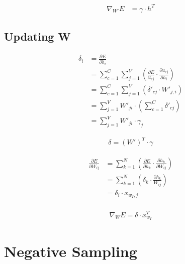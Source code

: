 \documentclass{article}
\begin{document}
	\begin{equation}
		\begin{aligned}
			\nabla_{W'} E &= \gamma \cdot h^T
		\end{aligned}	
	\end{equation}
	
	\subsection{Updating W}
	\begin{equation}
		\begin{aligned}
			\delta_i &= \frac{\partial E}{\partial h_i} \\
			&= \sum_{c=1}^{C}\sum_{j=1}^{V} \left( \frac{\partial E}{u_{cj}} \cdot \frac{\partial u_{cj}}{\partial h_i}\right)  \\
			&= \sum_{c=1}^{C}\sum_{j=1}^{V}\left( \delta'_{cj}\cdot W'_{j,i} \right)   \\
			&= \sum_{j=1}^{V} W'_{ji} \cdot \left(\sum_{c=1}^{C} \delta'_{cj} \right) \\
			&= \sum_{j=1}^{V} W'_{ji} \cdot \gamma_j
		\end{aligned}
	\end{equation}
	
	\begin{equation}
		\begin{aligned}
			\delta = (W')^T \cdot \gamma
		\end{aligned}
	\end{equation}
	
	\begin{equation}
		\begin{aligned}
			\frac{\partial E}{\partial W_{ij}} &= \sum_{k=1}^{N} \left( \frac{\partial E}{\partial h_k} \cdot \frac{\partial h_k}{\partial W_{ij}}\right) \\
			&= \sum_{k=1}^{N} \left( \delta_k \cdot \frac{\partial h_k}{W_{ij}}\right) \\
			&= \delta_i \cdot x_{w_I,j} \\
		\end{aligned}
	\end{equation}
	
	
	\begin{equation}
		\begin{aligned}
			\nabla_W E = \delta \cdot x_{w_I}^T
		\end{aligned}
	\end{equation}
	\section{Negative Sampling}
	
\end{document}
